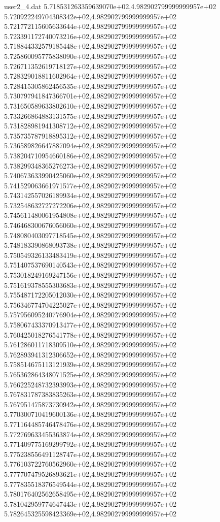 \begin{filecontents}{user2_4.dat}
5.718531263359639070e+02,4.982902799999999957e+02
5.720922249704308342e+02,4.982902799999999957e+02
5.721772115605633644e+02,4.982902799999999957e+02
5.723391172740073216e+02,4.982902799999999957e+02
5.718844332579185448e+02,4.982902799999999957e+02
5.725860095775838090e+02,4.982902799999999957e+02
5.726711352619718127e+02,4.982902799999999957e+02
5.728329018811602964e+02,4.982902799999999957e+02
5.728415305862456535e+02,4.982902799999999957e+02
5.730797941847366701e+02,4.982902799999999957e+02
5.731650589633802610e+02,4.982902799999999957e+02
5.733266864883131575e+02,4.982902799999999957e+02
5.731828981941308712e+02,4.982902799999999957e+02
5.735735787918895312e+02,4.982902799999999957e+02
5.736589826647887094e+02,4.982902799999999957e+02
5.738204710954660186e+02,4.982902799999999957e+02
5.738299348365276273e+02,4.982902799999999957e+02
5.740673633990425060e+02,4.982902799999999957e+02
5.741529063661971577e+02,4.982902799999999957e+02
5.743142557026189934e+02,4.982902799999999957e+02
5.732548632727272206e+02,4.982902799999999957e+02
5.745611480061954808e+02,4.982902799999999957e+02
5.746468300676056060e+02,4.982902799999999957e+02
5.748080403097718545e+02,4.982902799999999957e+02
5.748183390868093738e+02,4.982902799999999957e+02
5.750549326133483419e+02,4.982902799999999957e+02
5.751407537690140543e+02,4.982902799999999957e+02
5.753018249169247156e+02,4.982902799999999957e+02
5.751619378555303683e+02,4.982902799999999957e+02
5.755487172205012030e+02,4.982902799999999957e+02
5.756346774704225027e+02,4.982902799999999957e+02
5.757956095240776904e+02,4.982902799999999957e+02
5.758067433370913477e+02,4.982902799999999957e+02
5.760425018276541778e+02,4.982902799999999957e+02
5.761286011718309510e+02,4.982902799999999957e+02
5.762893941312306652e+02,4.982902799999999957e+02
5.758514675113121939e+02,4.982902799999999957e+02
5.765362864348071525e+02,4.982902799999999957e+02
5.766225248732393993e+02,4.982902799999999957e+02
5.767831787383835263e+02,4.982902799999999957e+02
5.767951475873730942e+02,4.982902799999999957e+02
5.770300710419600136e+02,4.982902799999999957e+02
5.771164485746478476e+02,4.982902799999999957e+02
5.772769633455363874e+02,4.982902799999999957e+02
5.771409775169299792e+02,4.982902799999999957e+02
5.775238556491128747e+02,4.982902799999999957e+02
5.776103722760562960e+02,4.982902799999999957e+02
5.777707479526893621e+02,4.982902799999999957e+02
5.777835518376549544e+02,4.982902799999999957e+02
5.780176402562658495e+02,4.982902799999999957e+02
5.781042959774647443e+02,4.982902799999999957e+02
5.782645325598423369e+02,4.982902799999999957e+02

\end{filecontents}

